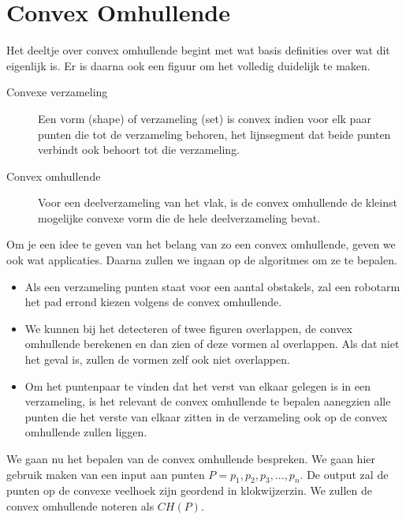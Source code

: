 \documentclass[12pt,a4paper]{article}
\begin{document}
	\section{Convex Omhullende}
	Het deeltje over convex omhullende begint met wat basis definities over wat dit eigenlijk is. Er is daarna ook een figuur om het volledig duidelijk te maken. 
		\begin{description}
			\item[Convexe verzameling] Een vorm (shape) of verzameling (set) is convex indien voor elk paar punten die tot de verzameling behoren, het lijnsegment dat beide punten verbindt ook behoort tot die verzameling. 
			\item[Convex omhullende] Voor een deelverzameling van het vlak, is de convex omhullende de kleinst mogelijke convexe vorm die de hele deelverzameling bevat. 
		\end{description}
	Om je een idee te geven van het belang van zo een convex omhullende, geven we ook wat applicaties. Daarna zullen we ingaan op de algoritmes om ze te bepalen. 
		\begin{itemize}
			\item Als een verzameling punten staat voor een aantal obstakels, zal een robotarm het pad 	errond kiezen volgens de convex omhullende. 
			\item We kunnen bij het detecteren of twee figuren overlappen, de convex omhullende berekenen en dan zien of deze vormen al overlappen. Als dat niet het geval is, zullen de vormen zelf ook niet overlappen. 
			\item Om het puntenpaar te vinden dat het verst van elkaar gelegen is in een verzameling, is het relevant de convex omhullende te bepalen aanegzien alle punten die het verste van elkaar zitten in de verzameling ook op de convex omhullende zullen liggen. 
		\end{itemize}
	We gaan nu het bepalen van de convex omhullende bespreken. We gaan hier gebruik maken van een input aan punten \(P = {p_1, p_2, p_3, ..., p_n}\). De output zal de punten op de convexe veelhoek zijn geordend in klokwijzerzin. We zullen de convex omhullende noteren als $CH(P)$.
	
	
\end{document}
